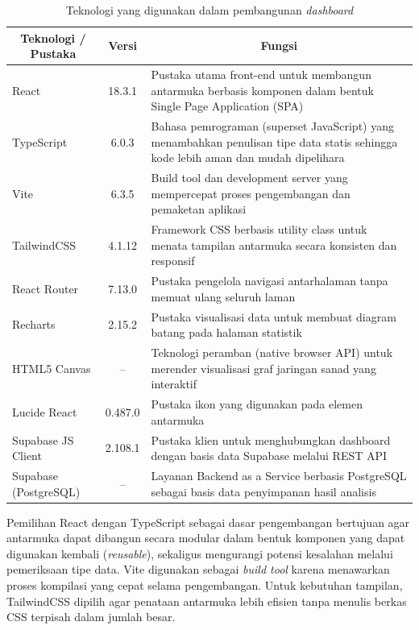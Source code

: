 \begin{table}[H]
\centering
\caption{Teknologi yang digunakan dalam pembangunan \textit{dashboard}}
\label{tab:teknologi}
\renewcommand{\arraystretch}{1.3}
\begin{tabular}{|p{3.7cm}|c|p{8.4cm}|}
\hline
\multicolumn{1}{|c|}{\textbf{Teknologi / Pustaka}} & \multicolumn{1}{c|}{\textbf{Versi}} & \multicolumn{1}{c|}{\textbf{Fungsi}} \\
\hline
React & 18.3.1 & Pustaka utama front-end untuk membangun antarmuka berbasis komponen dalam bentuk Single Page Application (SPA) \\
\hline
TypeScript & 6.0.3 & Bahasa pemrograman (superset JavaScript) yang menambahkan penulisan tipe data statis sehingga kode lebih aman dan mudah dipelihara \\
\hline
Vite & 6.3.5 & Build tool dan development server yang mempercepat proses pengembangan dan pemaketan aplikasi \\
\hline
TailwindCSS & 4.1.12 & Framework CSS berbasis utility class untuk menata tampilan antarmuka secara konsisten dan responsif \\
\hline
React Router & 7.13.0 & Pustaka pengelola navigasi antarhalaman tanpa memuat ulang seluruh laman \\
\hline
Recharts & 2.15.2 & Pustaka visualisasi data untuk membuat diagram batang pada halaman statistik \\
\hline
HTML5 Canvas & -- & Teknologi peramban (native browser API) untuk merender visualisasi graf jaringan sanad yang interaktif \\
\hline
Lucide React & 0.487.0 & Pustaka ikon yang digunakan pada elemen antarmuka \\
\hline
Supabase JS Client & 2.108.1 & Pustaka klien untuk menghubungkan dashboard dengan basis data Supabase melalui REST API \\
\hline
Supabase (PostgreSQL) & -- & Layanan Backend as a Service berbasis PostgreSQL sebagai basis data penyimpanan hasil analisis \\
\hline
\end{tabular}
\end{table}

Pemilihan React dengan TypeScript sebagai dasar pengembangan bertujuan agar antarmuka dapat dibangun secara modular dalam bentuk komponen yang dapat digunakan kembali (\textit{reusable}), sekaligus mengurangi potensi kesalahan melalui pemeriksaan tipe data. Vite digunakan sebagai \textit{build tool} karena menawarkan proses kompilasi yang cepat selama pengembangan. Untuk kebutuhan tampilan, TailwindCSS dipilih agar penataan antarmuka lebih efisien tanpa menulis berkas CSS terpisah dalam jumlah besar.

